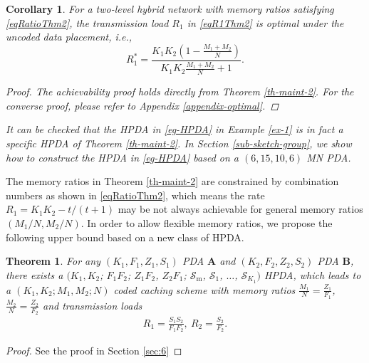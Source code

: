 \documentclass[onecolumn,10pt]{IEEEtran}
\theoremstyle{mythm}
\newtheorem{theorem}{Theorem}
\newtheorem{corollary}{Corollary}
\begin{document}
\begin{corollary}
\label{remark-optimal}
For a two-level hybrid   network with  {memory ratios} satisfying \eqref{eqRatioThm2}, the transmission load $R_1$ in \eqref{eqR1Thm2} is  \emph{optimal}  under the uncoded data placement, i.e.,
$$ R_1^*=\frac{K_1K_2(1-\frac{M_1+M_2}{N})}{K_1K_2\frac{M_1+M_2}{N}+1}.$$
\begin{proof}
The achievability proof holds directly from Theorem \ref{th-maint-2}. For the converse proof, please refer to  Appendix \ref{appendix-optimal}.
\end{proof}
  It can be checked that the HPDA  in  \eqref{eg-HPDA} in  Example \ref{ex-1} is in fact a specific HPDA of Theorem \ref{th-maint-2}. In Section \ref{sub-sketch-group}, we show how to construct  the HPDA   in \eqref{eg-HPDA} based on a $(6,15,10,6)$ MN PDA.

\end{corollary}


The memory ratios in Theorem  \ref{th-maint-2} are constrained by   combination numbers  as shown in \eqref{eqRatioThm2}, which means the rate $R_1={K_1K_2-t}/({t+1})$ may be not always   achievable  for  general memory ratios  $(M_1/N,M_2/N)$. In order to allow flexible   memory ratios, we propose the following upper bound based on a new class of HPDA.    %
\begin{theorem}
\label{th-maint-4}
For any $(K_1,F_1,Z_1,S_1)$ PDA $\mathbf{A}$ and $(K_2,F_2,Z_2,S_2)$ PDA $\mathbf{B}$, there exists a $(K_1,K_2$; $F_1F_2$; $Z_1F_2$, $Z_2F_1$; $\mathcal{S}_\text{m}$, $\mathcal{S}_1$, $\ldots$, $\mathcal{S}_{K_1})$ HPDA, which leads to a $(K_1,K_2;M_1,M_2;N)$ coded caching scheme with memory ratios $\frac{M_1}{N}=\frac{Z_1}{F_1}$,  $\frac{M_2}{N}=\frac{Z_2}{F_2}$ and transmission loads
\begin{eqnarray}
\label{co2-para}
R_1=\frac{S_1S_2}{F_1F_2},~ R_2=\frac{S_2}{F_2}.
\end{eqnarray}
\end{theorem}
\begin{proof}
See the proof in Section \ref{sec:6}
\end{proof}
\end{document}
